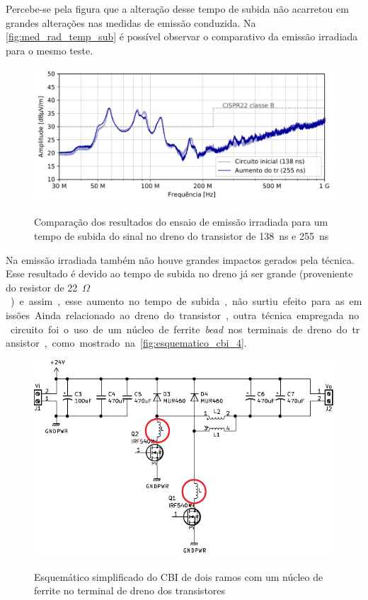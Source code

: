     Percebe-se pela figura que a alteração desse tempo de subida não acarretou em grandes alterações nas medidas de emissão conduzida. Na \autoref{fig:med_rad_temp_sub} é possível observar o comparativo da emissão irradiada para o mesmo teste.  
    
    \begin{figure}[H]
    	\centering
    	\caption{Comparação dos resultados do ensaio de emissão irradiada para um tempo de subida do sinal no dreno do transistor de \SI{138}{\nano\second} e \SI{255}{\nano\second}}
    	\includegraphics[scale=.9]{pdf/rad/Aumento do tr do transistor2.pdf}
    	\label{fig:med_rad_temp_sub}
    \end{figure}
    
    Na emissão irradiada também não houve grandes impactos gerados pela técnica. Esse resultado é devido ao tempo de subida no dreno já ser grande (proveniente do resistor de \SI{22}{$\Omega$}) e assim, esse aumento no tempo de subida, não surtiu efeito para as emissões. 
    
    Ainda relacionado ao dreno do transistor, outra técnica empregada no circuito foi o uso de um núcleo de ferrite \textit{bead} nos terminais de dreno do transistor, como mostrado na \autoref{fig:esquematico_cbi_4}. 
    
    \begin{figure}[H]
    	\centering
    	\caption{Esquemático simplificado do CBI de dois ramos com um núcleo de ferrite no terminal de dreno dos transistores}
    	\includegraphics[scale=1.2]{pdf/layout/Esquematico_CBI_bead.pdf}
        \label{fig:esquematico_cbi_4}
    \end{figure}
    

